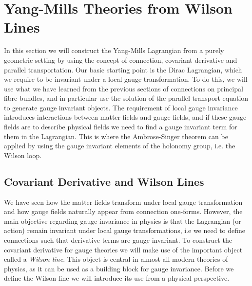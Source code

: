 \section{Yang-Mills Theories from Wilson Lines}\label{sec:Wilson lines and Wilson loops}
In this section we will construct the Yang-Mills Lagrangian from a purely geometric setting by using the concept of connection, covariant derivative and parallel transportation. Our basic starting point is the Dirac Lagrangian, which we require to be invariant under a local gauge transformation. To do this, we will use what we have learned from the previous sections of connections on principal fibre bundles, and in particular use the solution of the parallel transport equation to generate gauge invariant objects. The requirement of local gauge invariance introduces interactions between matter fields and gauge fields, and if these gauge fields are to describe physical fields we need to find a gauge invariant term for them in the Lagrangian. This is where the Ambrose-Singer theorem can be applied by using the gauge invariant elements of the holonomy group, i.e. the Wilson loop.

\subsection{Covariant Derivative and Wilson Lines}\label{sec:Wilson lines}
We have seen how the matter fields transform under local gauge transformation and how gauge fields naturally appear from connection one-forms. However, the main objective regarding gauge invariance in physics is that the Lagrangian (or action) remain invariant under local gauge transformations, i.e we need to define connections such that derivative terms are gauge invariant. To construct the covariant derivative for gauge theories we will make use of the important object called a \emph{Wilson line}. This object is central in almost all modern theories of physics, as it can be used as a building block for gauge invariance. Before we define the Wilson line we will introduce its use from a physical perspective.


